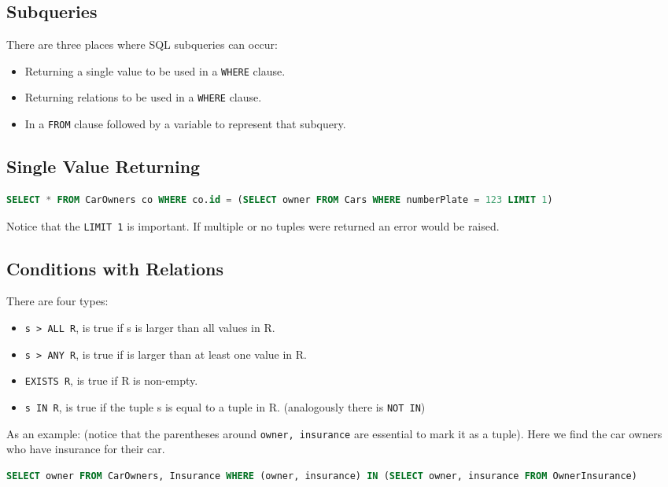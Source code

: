 \documentclass{sciposter}
\renewcommand{\t}[1]{\texttt{#1}}
\begin{document}
\begin{multicols}{3}
\section*{Subqueries}

There are three places where SQL subqueries can occur:

\begin{itemize}
	\item Returning a single value to be used in a \t{WHERE} clause.
	\item Returning relations to be used in a \t{WHERE} clause.
	\item In a \t{FROM} clause followed by a variable to represent that subquery.
\end{itemize}

\subsection*{Single Value Returning}
\begin{lstlisting}[language=SQL]
SELECT * FROM CarOwners co WHERE co.id = (SELECT owner FROM Cars WHERE numberPlate = 123 LIMIT 1)
\end{lstlisting}
Notice that the \t{LIMIT 1} is important. If multiple or no tuples were returned an error would be raised.

\subsection*{Conditions with Relations}

There are four types:

\begin{itemize}
	\item \t{s > ALL R}, is true if s is larger than all values in R.
	\item \t{s > ANY R}, is true if is larger than at least one value in R.
	\item \t{EXISTS R}, is true if R is non-empty.
	\item \t{s IN R}, is true if the tuple s is equal to a tuple in R. (analogously there is \t{NOT IN})
\end{itemize}

As an example: (notice that the parentheses around \t{owner, insurance} are essential to mark it as a tuple). Here we find the car owners who have insurance for their car.
\begin{lstlisting}[language=SQL]
SELECT owner FROM CarOwners, Insurance WHERE (owner, insurance) IN (SELECT owner, insurance FROM OwnerInsurance)
\end{lstlisting}


\end{multicols}
\end{document}
